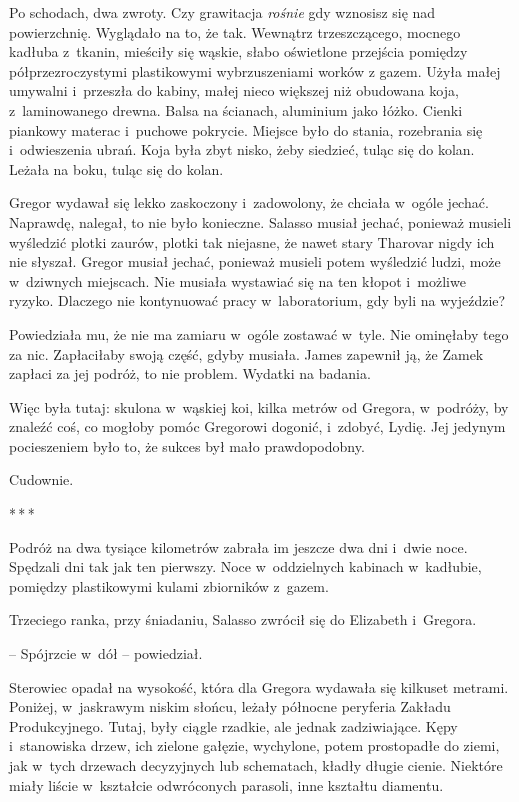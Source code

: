 \documentclass[oneside,polish,12pt,sfheadings]{mwbk}
\newcommand{\threeast}{\bigskip\par\centerline{*\,*\,*}\medskip\par}%
\begin{document}
Po schodach, dwa zwroty. Czy grawitacja \emph{rośnie} gdy wznosisz się
nad powierzchnię. Wyglądało na to, że tak. Wewnątrz trzeszczącego,
mocnego kadłuba z~tkanin, mieściły się wąskie, słabo oświetlone
przejścia pomiędzy półprzezroczystymi plastikowymi wybrzuszeniami worków
z gazem. Użyła małej umywalni i~przeszła do kabiny, małej nieco większej
niż obudowana koja, z~laminowanego drewna. Balsa na ścianach, aluminium
jako łóżko. Cienki piankowy materac i~puchowe pokrycie. Miejsce było do
stania, rozebrania się i~odwieszenia ubrań. Koja była zbyt nisko, żeby
siedzieć, tuląc się do kolan. Leżała na boku, tuląc się do kolan.

Gregor wydawał się lekko zaskoczony i~zadowolony, że chciała w~ogóle
jechać. Naprawdę, nalegał, to nie było konieczne. Salasso musiał jechać,
ponieważ musieli wyśledzić plotki zaurów, plotki tak niejasne, że nawet
stary Tharovar nigdy ich nie słyszał. Gregor musiał jechać, ponieważ
musieli potem wyśledzić ludzi, może w~dziwnych miejscach. Nie musiała
wystawiać się na ten kłopot i~możliwe ryzyko. Dlaczego nie kontynuować
pracy w~laboratorium, gdy byli na wyjeździe?

Powiedziała mu, że nie ma zamiaru w~ogóle zostawać w~tyle. Nie ominęłaby
tego za nic. Zapłaciłaby swoją część, gdyby musiała. James zapewnił ją,
że Zamek zapłaci za jej podróż, to nie problem. Wydatki na badania.

Więc była tutaj: skulona w~wąskiej koi, kilka metrów od Gregora, w~podróży, by znaleźć coś, co mogłoby pomóc Gregorowi dogonić, i~zdobyć,
Lydię. Jej jedynym pocieszeniem było to, że sukces był mało
prawdopodobny.

Cudownie.

\threeast

Podróż na dwa tysiące kilometrów zabrała im jeszcze dwa dni i~dwie noce.
Spędzali dni tak jak ten pierwszy. Noce w~oddzielnych kabinach w~kadłubie, pomiędzy plastikowymi kulami zbiorników z~gazem.

Trzeciego ranka, przy śniadaniu, Salasso zwrócił się do Elizabeth i~Gregora.

-- Spójrzcie w~dół -- powiedział.

Sterowiec opadał na wysokość, która dla Gregora wydawała się kilkuset
metrami. Poniżej, w~jaskrawym niskim słońcu, leżały północne peryferia
Zakładu Produkcyjnego. Tutaj, były ciągle rzadkie, ale jednak
zadziwiające. Kępy i~stanowiska drzew, ich zielone gałęzie, wychylone,
potem prostopadłe do ziemi, jak w~tych drzewach decyzyjnych lub
schematach, kładły długie cienie. Niektóre miały liście w~kształcie
odwróconych parasoli, inne kształtu diamentu.
\end{document}
